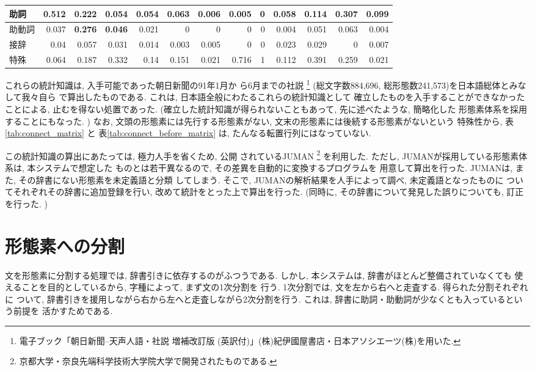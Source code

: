 \begin{table}
\begin{center}
\begin{tabular}{l|r|r|r|r|r|r|r|r|r|r|r|r}
   \hline
   助詞      & 0.512 & 0.222 &  0.054 &  0.054 &  0.063 
             &  0.006 &  0.005 &     0  &  0.058
             & 0.114 & 0.307 & 0.099  \\
   \hline
   助動詞    & 0.037 &{\bf  0.276} &{\bf 0.046} &  0.021 &      0 
             &      0 &      0 &      0 &  0.004
             &  0.051 &  0.063 &  0.004  \\
   \hline
   接辞      & 0.04 &  0.057 &  0.031 &  0.014 &  0.003
             &  0.005 &      0 &      0 & 0.023
             &  0.029 &      0 &  0.007  \\
   \hline
   特殊      & 0.064 & 0.187 &  0.332 & 0.14 & 0.151 
             &  0.021 & 0.716 & 1 & 0.112
             & 0.391 & 0.259 & 0.021  \\
   \hline
\end{tabular}
\end{center}
\end{table}
これらの統計知識は, 入手可能であった朝日新聞の91年1月か
ら6月までの社説
\footnote{電子ブック「朝日新聞--天声人語・社説 増補改訂版
(英訳付)」(株)紀伊國屋書店・日本アソシエーツ(株)を用いた. }
(総文字数884,696, 総形態数241,573)を日本語総体とみなして我々自ら
で算出したものである.  これは, 日本語全般にわたるこれらの統計知識として
確立したものを入手することができなかったことによる, 止むを得ない処置であった.  
(確立した統計知識が得られないこともあって, 先に述べたような, 簡略化した
形態素体系を採用することにもなった.  )
なお, 文頭の形態素には先行する形態素がない, 
文末の形態素には後続する形態素がないという
特殊性から, 表\ref{tab:connect_matrix} と
表\ref{tab:connect_before_matrix} は, 
たんなる転置行列にはなっていない.  

この統計知識の算出にあたっては, 極力人手を省くため, 公開
されているJUMAN
\footnote{京都大学・奈良先端科学技術大学院大学で開発されたものである.}
を利用した.  ただし, JUMANが採用している形態素体系は, 本システムで想定した
ものとは若干異なるので, その差異を自動的に変換するプログラムを
用意して算出を行った.  JUMANは, また, その辞書にない形態素を未定義語と分類
してしまう.  そこで, JUMANの解析結果を人手によって調べ, 未定義語となったものに
ついてそれぞれその辞書に追加登録を行い, 改めて統計をとった上で算出を行った.
(同時に, その辞書について発見した誤りについても, 訂正を行った.  )

\section{形態素への分割}
\label{word}
文を形態素に分割する処理では, 辞書引きに依存するのがふつうである.  
しかし, 本システムは, 辞書がほとんど整備されていなくても
使えることを目的としているから, 字種によって,  まず文の1次分割を
行う.  1次分割では, 文を左から右へと走査する.  得られた分割それぞれに
ついて, 辞書引きを援用しながら右から左へと走査しながら2次分割を行う.  
これは, 辞書に助詞・助動詞が少なくとも入っているという前提を
活かすためである. 

